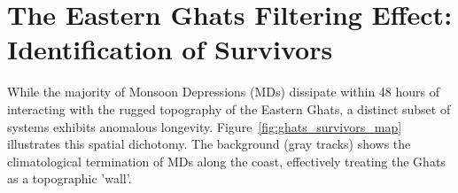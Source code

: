 %
%

\section{The Eastern Ghats Filtering Effect: Identification of Survivors}
\label{sec:ghats_filtering}

While the majority of Monsoon Depressions (MDs) dissipate within 48
hours of interacting with the rugged topography of the Eastern Ghats,
a distinct subset of systems exhibits anomalous longevity.
Figure~\ref{fig:ghats_survivors_map} illustrates this spatial
dichotomy. The background (gray tracks) shows the climatological
termination of MDs along the coast, effectively treating the Ghats as
a topographic 'wall'.

